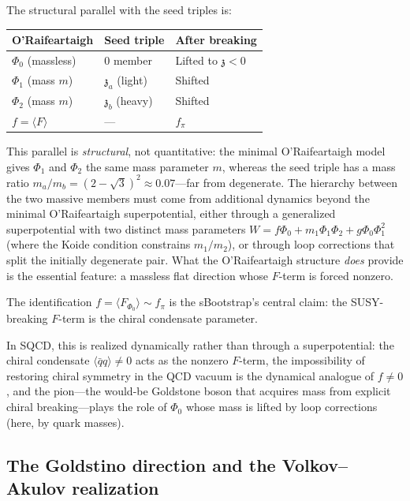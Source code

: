 \documentclass[12pt,a4paper]{article}
\newcommand{\qqbar}{\langle\bar{q}q\rangle}
\newcommand{\zch}{\mathfrak{z}}
\begin{document}
The structural parallel with the seed triples is:

\begin{center}
\begin{tabular}{lll}
\toprule
O'Raifeartaigh & Seed triple & After breaking \\
\midrule
$\Phi_0$ (massless) & 0 member & Lifted to $\zch < 0$ \\
$\Phi_1$ (mass $m$) & $\zch_a$ (light) & Shifted \\
$\Phi_2$ (mass $m$) & $\zch_b$ (heavy) & Shifted \\
\midrule
$f = \langle F\rangle$ & --- & $f_\pi$ \\
\bottomrule
\end{tabular}
\end{center}

This parallel is \emph{structural}, not quantitative: the minimal 
O'Raifeartaigh model gives $\Phi_1$ and $\Phi_2$ the same mass 
parameter $m$, whereas the seed triple has a mass ratio 
$m_a/m_b = (2 - \sqrt{3})^2 \approx 0.07$---far from degenerate. 
The hierarchy between the two massive members must come from 
additional dynamics beyond the minimal O'Raifeartaigh superpotential, 
either through a generalized superpotential with two distinct mass 
parameters $W = f\Phi_0 + m_1\Phi_1\Phi_2 + g\Phi_0\Phi_1^2$ 
(where the Koide condition constrains $m_1/m_2$), or through loop 
corrections that split the initially degenerate pair. What the 
O'Raifeartaigh structure \emph{does} provide is the essential 
feature: a massless flat direction whose $F$-term is forced nonzero.

The identification $f = \langle F_{\Phi_0}\rangle \sim f_\pi$ is the 
sBootstrap's central claim: the SUSY-breaking $F$-term is the chiral 
condensate parameter.

In SQCD, this is realized dynamically rather than through a 
superpotential: the chiral condensate $\qqbar \neq 0$ acts as the 
nonzero $F$-term, the impossibility of restoring chiral symmetry 
in the QCD vacuum is the dynamical analogue of $f \neq 0$, and the 
pion---the would-be Goldstone boson that acquires mass from explicit 
chiral breaking---plays the role of $\Phi_0$ whose mass is lifted 
by loop corrections (here, by quark masses).

\subsection{The Goldstino direction and the Volkov--Akulov realization}
\label{subsec:va}
\end{document}
